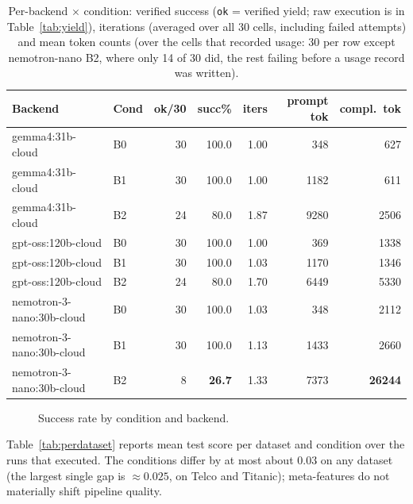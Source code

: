 \begin{table}[H]
\centering
\caption{Per-backend $\times$ condition: verified success
(\texttt{ok} = verified yield; raw execution is in
Table~\ref{tab:yield}), iterations (averaged over all 30 cells,
including failed attempts) and mean token counts (over the cells that
recorded usage: 30 per row except nemotron-nano B2, where only 14
of 30 did, the rest failing before a usage record was written).}
\label{tab:permodel}
\scriptsize
\renewcommand{\arraystretch}{1.25}
\begin{tabular}{l l r r r r r}
\toprule
\textbf{Backend} & \textbf{Cond} & \textbf{ok/30} & \textbf{succ\%} &
\textbf{iters} & \textbf{prompt tok} & \textbf{compl.\ tok} \\
\midrule
gemma4:31b-cloud          & B0 & 30 & 100.0 & 1.00 & 348  & 627 \\
gemma4:31b-cloud          & B1 & 30 & 100.0 & 1.00 & 1182 & 611 \\
gemma4:31b-cloud          & B2 & 24 & 80.0  & 1.87 & 9280 & 2506 \\
gpt-oss:120b-cloud        & B0 & 30 & 100.0 & 1.00 & 369  & 1338 \\
gpt-oss:120b-cloud        & B1 & 30 & 100.0 & 1.03 & 1170 & 1346 \\
gpt-oss:120b-cloud        & B2 & 24 & 80.0  & 1.70 & 6449 & 5330 \\
nemotron-3-nano:30b-cloud & B0 & 30 & 100.0 & 1.03 & 348  & 2112 \\
nemotron-3-nano:30b-cloud & B1 & 30 & 100.0 & 1.13 & 1433 & 2660 \\
nemotron-3-nano:30b-cloud & B2 & 8  & \textbf{26.7} & 1.33 & 7373 & \textbf{26244} \\
\bottomrule
\end{tabular}
\end{table}

\begin{figure}[H]
    \centering
    \caption{Success rate by condition and backend.}
    \label{fig:success}
\end{figure}

Table~\ref{tab:perdataset} reports mean test score per dataset and
condition over the runs that executed. The conditions differ by at
most about $0.03$ on any dataset (the largest single gap is
$\approx 0.025$, on Telco and Titanic); meta-features do not
materially shift pipeline quality.

